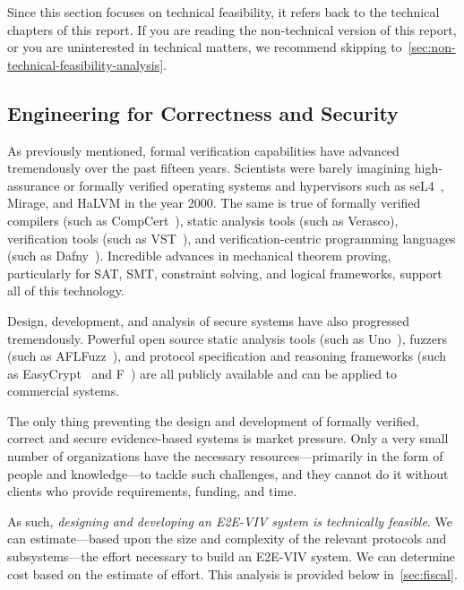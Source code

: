 Since this section focuses on technical feasibility, it refers back to
the technical chapters of this report.  If you are reading the
non-technical version of this report, or you are uninterested in
technical matters, we recommend skipping
to~\autoref{sec:non-technical-feasibility-analysis}.

\subsection{Engineering for Correctness and Security}

As previously mentioned, formal verification capabilities have
advanced tremendously over the past fifteen years. Scientists were
barely imagining high-assurance or formally verified operating systems
and hypervisors such as seL4~\cite{klein2009sel4}, Mirage, and HaLVM
in the year 2000. The same is true of formally verified compilers
(such as CompCert~\cite{CompCert}), static analysis tools (such as
Verasco), verification tools (such as VST~\cite{VST}), and
verification-centric programming languages (such as
Dafny~\cite{Dafny}). Incredible advances in mechanical theorem
proving, particularly for SAT, SMT, constraint solving, and logical
frameworks, support all of this technology.

Design, development, and analysis of secure systems have also
progressed tremendously. Powerful open source static analysis tools
(such as Uno~\cite{holzmann2002static}), fuzzers (such as
AFLFuzz~\cite{AFLFuzz}), and protocol specification and reasoning
frameworks (such as EasyCrypt~\cite{EasyCrypt} and F\*~\cite{Fstar})
are all publicly available and can be applied to commercial systems.

The only thing preventing the design and development of formally
verified, correct and secure evidence-based systems is market
pressure. Only a very small number of organizations have the necessary
resources---primarily in the form of people and knowledge---to tackle
such challenges, and they cannot do it without clients who provide
requirements, funding, and time.

As such, \emph{designing and developing an E2E-VIV system is
  technically feasible}.  We can estimate---based upon the size and
complexity of the relevant protocols and subsystems---the effort
necessary to build an E2E-VIV system.  We can determine cost based on
the estimate of effort. This analysis is provided below
in~\autoref{sec:fiscal}.

